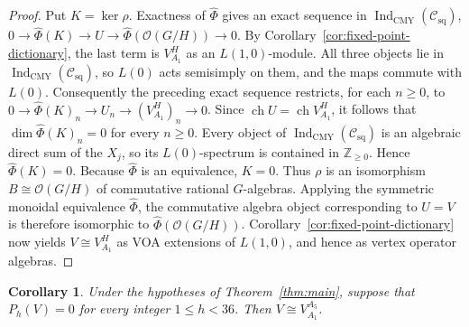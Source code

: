 \documentclass[10pt,a4paper]{amsart}
\numberwithin{equation}{section} \newtheorem{thm}{Theorem}[section] \newtheorem{lem}[thm]{Lemma} \newtheorem{ex}[thm]{Example} \newtheorem{prop}[thm]{Proposition} \newtheorem{cor}[thm]{Corollary} \newtheorem{defi}[thm]{Definition} \newtheorem{rmk}[thm]{Remark} \newtheorem{notation}[thm]{Notation}
\newcommand{\ch}{\operatorname{ch}}
\newcommand{\OO}{\mathcal O}
\newcommand{\Csq}{\mathcal C_{\mathrm{sq}}}
\newcommand{\IndCMY}{\operatorname{Ind}_{\mathrm{CMY}}}
\def\Z{\mathbb{Z}} \def\N{\mathbb{N}} \def\A{\mathbb{A}} \def\C{\mathbb{C}} \def\R{\mathbb{R}} \def\Q{\mathbb{Q}} \def\F{\mathbb{F}}
\begin{document}
\begin{proof}
Put \(K=\ker\rho\). Exactness of $\widehat\Phi$ gives an exact sequence in $\IndCMY(\Csq)$, \(0\longrightarrow\widehat\Phi(K)\longrightarrow U \longrightarrow\widehat\Phi(\OO(G/H))\longrightarrow0\). By Corollary~\ref{cor:fixed-point-dictionary}, the last term is $V_{A_1}^{H}$ as an $L(1,0)$-module. All three objects lie in $\IndCMY(\Csq)$, so $L(0)$ acts semisimply on them, and the maps commute with $L(0)$. Consequently the preceding exact sequence restricts, for each $n\ge0$, to \(0\longrightarrow\widehat\Phi(K)_n\longrightarrow U_n \longrightarrow (V_{A_1}^{H})_n\longrightarrow0\). Since \(\ch U=\ch V_{A_1}^{H}\), it follows that \(\dim\widehat\Phi(K)_n=0\) for every $n\ge0$. Every object of $\IndCMY(\Csq)$ is an algebraic direct sum of the $X_j$, so its $L(0)$-spectrum is contained in $\Z_{\ge0}$. Hence \(\widehat\Phi(K)=0\). Because $\widehat\Phi$ is an equivalence, $K=0$. Thus $\rho$ is an isomorphism \(B\cong\OO(G/H)\) of commutative rational $G$-algebras. Applying the symmetric monoidal equivalence $\widehat\Phi$, the commutative algebra object corresponding to $U=V$ is therefore isomorphic to \(\widehat\Phi(\OO(G/H))\). Corollary~\ref{cor:fixed-point-dictionary} now yields \(V\cong V_{A_1}^{H}\) as VOA extensions of $L(1,0)$, and hence as vertex operator algebras.
\end{proof}

\begin{cor}\label{cor:A5-gap}
Under the hypotheses of Theorem~\ref{thm:main}, suppose that $ P_h(V)=0 $ for every integer $1\le h<36$. Then \(V\cong V_{A_1}^{A_5}\).
\end{cor}
\end{document}
